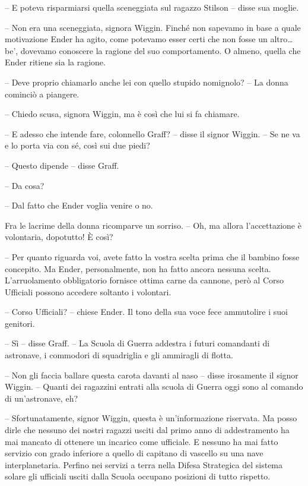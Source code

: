 {-- E poteva risparmiarsi quella sceneggiata sul ragazzo Stilson --
	disse sua moglie.}

{-- Non era una sceneggiata, signora Wiggin. Finché non sapevamo in base
	a quale motivazione Ender ha agito, come potevamo esser certi che non
	fosse un altro\ldots{} be', dovevamo conoscere la ragione del suo
	comportamento. O almeno, quella che Ender ritiene sia la ragione.}

{-- Deve proprio chiamarlo anche lei con quello stupido nomignolo? -- La
	donna cominciò a piangere.}

{-- Chiedo scusa, signora Wiggin, ma è così che lui si fa chiamare.}

{-- E adesso che intende fare, colonnello Graff? -- disse il signor
	Wiggin. -- Se ne va e lo porta via con sé, così sui due piedi?}

{-- Questo dipende -- disse Graff.}

{-- Da cosa?}

{-- Dal fatto che Ender voglia venire o no.}

{Fra le lacrime della donna ricomparve un sorriso. -- Oh, ma allora
	l'accettazione è volontaria, dopotutto! È così?}

{-- Per quanto riguarda voi, avete fatto la vostra scelta prima che il
	bambino fosse concepito. Ma Ender, personalmente, non ha fatto ancora
	nessuna scelta. L'arruolamento obbligatorio fornisce ottima carne da
	cannone, però al Corso Ufficiali possono accedere soltanto i volontari.}

{-- Corso Ufficiali? -- chiese Ender. Il tono della sua voce fece
	ammutolire i suoi genitori.}

{-- Sì -- disse Graff. -- La Scuola di Guerra addestra i futuri
	comandanti di astronave, i commodori di squadriglia e gli ammiragli di
	flotta.}

{-- Non gli faccia ballare questa carota davanti al naso -- disse
	irosamente il signor Wiggin. -- Quanti dei ragazzini entrati alla scuola
	di Guerra oggi sono al comando di un'astronave, eh?}

{-- Sfortunatamente, signor Wiggin, questa è un'informazione riservata.
	Ma posso dirle che nessuno dei nostri ragazzi usciti dal primo anno di
	addestramento ha mai mancato di ottenere un incarico come ufficiale. E
	nessuno ha mai fatto servizio con grado inferiore a quello di capitano
	di vascello su una nave interplanetaria. Perfino nei servizi a terra
	nella Difesa Strategica del sistema solare gli ufficiali usciti dalla
	Scuola occupano posizioni di tutto rispetto.}

